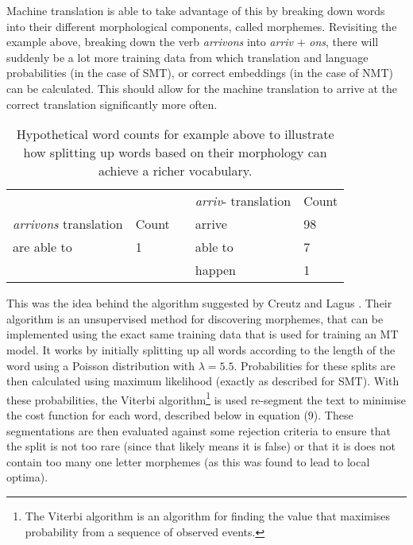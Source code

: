 \documentclass[11pt]{article}
\begin{document}
\bigskip

Machine translation is able to take advantage of this by breaking down words into their different morphological components, called morphemes. Revisiting the example above, breaking down the verb \textit{arrivons} into \textit{arriv} + \textit{ons}, there will suddenly be a lot more training data from which translation and language probabilities (in the case of SMT), or correct embeddings (in the case of NMT) can be calculated. This should allow for the machine translation to arrive at the correct translation significantly more often.

\begin{table}[h]
\centering
\begin{tabular}{lll|l|l|}
\cline{4-5}
                                           &                            &  & \textit{arriv}- translation & Count \\ \cline{1-2} \cline{4-5} 
\multicolumn{1}{|l|}{\textit{arrivons} translation} & \multicolumn{1}{l|}{Count} &  & arrive             & 98    \\ \cline{1-2} \cline{4-5} 
\multicolumn{1}{|l|}{are able to}          & \multicolumn{1}{l|}{1}     &  & able to            & 7     \\ \cline{1-2} \cline{4-5} 
                                           &                            &  & happen             & 1     \\ \cline{4-5} 
\end{tabular}
\caption{Hypothetical word counts for example above to illustrate how splitting up words based on their morphology can achieve a richer vocabulary.}
\label{table:count-ex}
\end{table}

\bigskip

This was the idea behind the algorithm suggested by Creutz and Lagus \citeyearpar{creutz-lagus-2002-unsupervised}. Their algorithm is an unsupervised method for discovering morphemes, that can be implemented using the exact same training data that is used for training an MT model. It works by initially splitting up all words according to the length of the word using a Poisson distribution with $\lambda = 5.5$. Probabilities for these splits are then calculated using maximum likelihood (exactly as described for SMT). With these probabilities, the Viterbi algorithm\footnote{The Viterbi algorithm is an algorithm for finding the value that maximises probability from a sequence of observed events.} is used re-segment the text to minimise the cost function for each word, described below in equation (9). These segmentations are then evaluated against some rejection criteria to ensure that the split is not too rare (since that likely means it is false) or that it is does not contain too many one letter morphemes (as this was found to lead to local optima).
\end{document}
